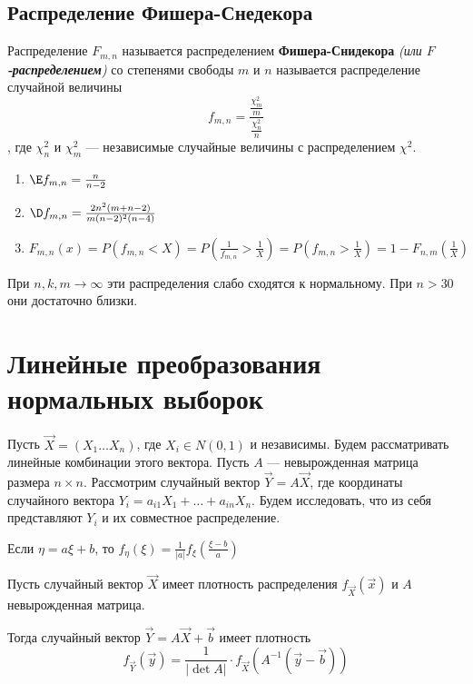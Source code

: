 \subsection{Распределение Фишера-Снедекора}

\begin{definition}
    Распределение \(F_{m, n}\) называется распределением \textbf{Фишера-Снидекора} \textit{(или \textbf{\(F\)-распределением})} со степенями свободы \(m\) и \(n\) называется распределение случайной величины
    \[f_{m, n} = \frac{\frac{\chi_m^2}{m}}{\frac{\chi_n^2}{n}}\]
    , где \(\chi_n^2\) и \(\chi_m^2\) --- независимые случайные величины с распределением \(\chi^2\).
\end{definition}

\begin{prop}\itemfix
    \begin{enumerate}
        \item \(\E f_{m, n} = \frac{n}{n - 2}\)
        \item \(\D f_{m, n} = \frac{2n^2(m + n - 2)}{m(n - 2)^2(n - 4)}\)
        \item \(F_{m, n}(x) = P(f_{m, n} < X) = P\left(\frac{1}{f_{m, n}} > \frac{1}{X}\right) = P\left(f_{m, n} > \frac{1}{X}\right) = 1 - F_{n, m}\left(\frac{1}{X}\right)\)
    \end{enumerate}
\end{prop}

При \(n, k, m \to \infty\) эти распределения слабо сходятся к нормальному. При \(n > 30\) они достаточно близки.

\section{Линейные преобразования нормальных выборок}

Пусть \(\vec{X} = (X_1 \dots X_n)\), где \(X_i \in N(0, 1)\) и независимы. Будем рассматривать линейные комбинации этого вектора. Пусть \(A\) --- невырожденная матрица размера \(n \times n\). Рассмотрим случайный вектор \(\vec{Y} = A \vec{X}\), где координаты случайного вектора \(Y_i = a_{i 1} X_1 + \dots + a_{i n} X_n\). Будем исследовать, что из себя представляют \(Y_i\) и их совместное распределение.

\begin{remark}
    Если \(\eta = a \xi + b\), то \(f_\eta(\xi) = \frac{1}{|a|} f_\xi\left(\frac{\xi - b}{a}\right)\)
\end{remark}

\begin{theorem}
    Пусть случайный вектор \(\vec{X}\) имеет плотность распределения \(f_{\vec{X}} (\vec{x})\) и \(A\) невырожденная матрица.

    Тогда случайный вектор \(\vec{Y} = A \vec{X} + \vec{b}\) имеет плотность
    \[f_{ \vec{Y}}(\vec{y}) = \frac{1}{|\det A|} \cdot f_{ \vec{X}}(A^{ - 1}(\vec{y} - \vec{b}))\]
\end{theorem}

